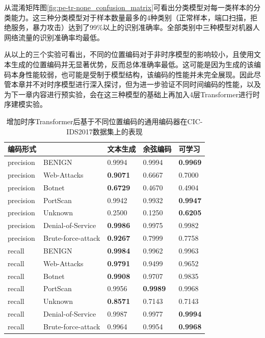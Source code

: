 从混淆矩阵图\ref{fig:pe-tr-none_confusion_matrix}可看出分类模型对每一类样本的分类能力。这三种分类模型对于样本数量最多的4种类别（正常样本，端口扫描，拒绝服务，暴力攻击）达到了99\%以上的识别准确率。全部类别中三种模型对机器人网络流量的识别准确率均最低。

从以上的三个实验可看出，不同的位置编码对于非时序模型的影响较小，且使用文本生成的位置编码并无显著优势，反而总体准确率最低。这可能是因为生成的该编码本身性能较弱，也可能是受制于模型结构，该编码的性能并未完全展现。因此尽管本章并不对时序模型进行深入探讨，但为进一步验证不同时间编码的性能，以及为下一章内容进行预实验，会在这三种模型的基础上再加入4层Transformer进行时序建模实验。

\begin{table}[!ht]
    \centering
    \caption{增加时序Transformer后基于不同位置编码的通用编码器在CIC-IDS2017数据集上的表现}
    \begin{adjustbox}{max width=.75\textwidth}
    \begin{tabular}{lllll}
    \toprule
        编码形式 & ~ & 文本生成 & 余弦编码  &可学习  \\ \midrule
        precision & BENIGN & 0.9994  & 0.9994  & \textbf{0.9969} \\
        precision & Web-Attacks & \textbf{0.9071} & 0.6667  & 0.7000  \\
        precision & Botnet & \textbf{0.6729} & 0.4670  & 0.4904  \\
        precision & PortScan & 0.9942  & 0.9932  & \textbf{0.9947} \\
        precision & Unknown & 0.2500  & 0.1250  & \textbf{0.6205} \\
        precision & Denial-of-Service & \textbf{0.9986} & 0.9975  & 0.9982  \\
        precision & Brute-force-attack & \textbf{0.9267} & 0.7999  & 0.7758  \\
        recall & BENIGN & \textbf{0.9984} & 0.9962  & 0.9963  \\
        recall & Web-Attacks & \textbf{0.9791} & 0.9499  & 0.9652  \\
        recall & Botnet & \textbf{0.9908} & 0.9707  & 0.9835  \\
        recall & PortScan & 0.9956  & \textbf{0.9989} & 0.9968  \\
        recall & Unknown & \textbf{0.8571} & 0.7143  & 0.7143  \\
        recall & Denial-of-Service & 0.9987  & 0.9977  & \textbf{0.9994} \\
        recall & Brute-force-attack & 0.9964  & 0.9954  & \textbf{0.9968} \\

\end{tabular}
\end{adjustbox}
\end{table}
